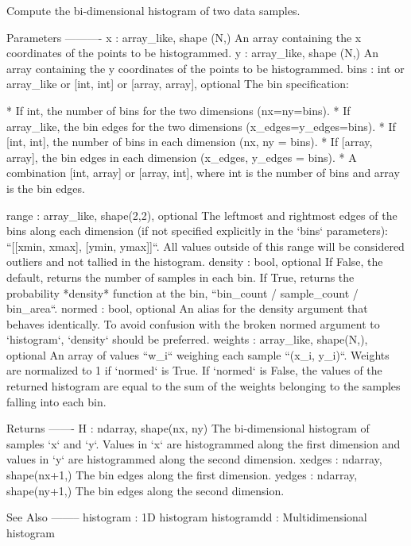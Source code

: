 \begin{DoxyVerb}Compute the bi-dimensional histogram of two data samples.

Parameters
----------
x : array_like, shape (N,)
    An array containing the x coordinates of the points to be
    histogrammed.
y : array_like, shape (N,)
    An array containing the y coordinates of the points to be
    histogrammed.
bins : int or array_like or [int, int] or [array, array], optional
    The bin specification:

      * If int, the number of bins for the two dimensions (nx=ny=bins).
      * If array_like, the bin edges for the two dimensions
        (x_edges=y_edges=bins).
      * If [int, int], the number of bins in each dimension
        (nx, ny = bins).
      * If [array, array], the bin edges in each dimension
        (x_edges, y_edges = bins).
      * A combination [int, array] or [array, int], where int
        is the number of bins and array is the bin edges.

range : array_like, shape(2,2), optional
    The leftmost and rightmost edges of the bins along each dimension
    (if not specified explicitly in the `bins` parameters):
    ``[[xmin, xmax], [ymin, ymax]]``. All values outside of this range
    will be considered outliers and not tallied in the histogram.
density : bool, optional
    If False, the default, returns the number of samples in each bin.
    If True, returns the probability *density* function at the bin,
    ``bin_count / sample_count / bin_area``.
normed : bool, optional
    An alias for the density argument that behaves identically. To avoid
    confusion with the broken normed argument to `histogram`, `density`
    should be preferred.
weights : array_like, shape(N,), optional
    An array of values ``w_i`` weighing each sample ``(x_i, y_i)``.
    Weights are normalized to 1 if `normed` is True. If `normed` is
    False, the values of the returned histogram are equal to the sum of
    the weights belonging to the samples falling into each bin.

Returns
-------
H : ndarray, shape(nx, ny)
    The bi-dimensional histogram of samples `x` and `y`. Values in `x`
    are histogrammed along the first dimension and values in `y` are
    histogrammed along the second dimension.
xedges : ndarray, shape(nx+1,)
    The bin edges along the first dimension.
yedges : ndarray, shape(ny+1,)
    The bin edges along the second dimension.

See Also
--------
histogram : 1D histogram
histogramdd : Multidimensional histogram


\end{DoxyVerb}
